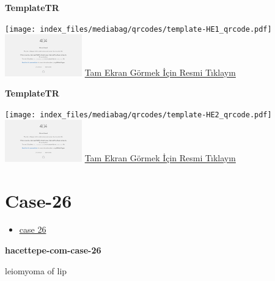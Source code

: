 \documentclass[
  letterpaper,
  DIV=11,
  numbers=noendperiod]{scrreprt}
\providecommand{\tightlist}{%
  \setlength{\itemsep}{0pt}\setlength{\parskip}{0pt}}\usepackage{longtable,booktabs,array}
\begin{document}
\textbf{TemplateTR}

\texttt{[image: index\_files/mediabag/qrcodes/template-HE1\_qrcode.pdf]}
\href{https://images.patolojiatlasi.com/template/HE1.html}{\includegraphics[width=0.25\textwidth,height=\textheight]{./screenshots/thumbnail_template-HE1.png}}
\href{https://images.patolojiatlasi.com/template/HE1.html}{Tam Ekran
Görmek İçin Resmi Tıklayın}

\textbf{TemplateTR}

\texttt{[image: index\_files/mediabag/qrcodes/template-HE2\_qrcode.pdf]}
\href{https://images.patolojiatlasi.com/template/HE2.html}{\includegraphics[width=0.25\textwidth,height=\textheight]{./screenshots/thumbnail_template-HE2.png}}
\href{https://images.patolojiatlasi.com/template/HE2.html}{Tam Ekran
Görmek İçin Resmi Tıklayın}

\hypertarget{sec-hacettepe-case-of-the-month-case-26}{%
\section{Case-26}\label{sec-hacettepe-case-of-the-month-case-26}}

\begin{itemize}
\tightlist
\item
  \href{https://www.youtube.com/watch?v=UHadS40tpkY&ab_channel=KemalKosemehmetoglu}{case
  26}
\end{itemize}

\textbf{hacettepe-com-case-26}

\begin{tcolorbox}[enhanced jigsaw, breakable, opacitybacktitle=0.6, arc=.35mm, colbacktitle=quarto-callout-tip-color!10!white, colback=white, toptitle=1mm, left=2mm, opacityback=0, colframe=quarto-callout-tip-color-frame, titlerule=0mm, rightrule=.15mm, bottomrule=.15mm, toprule=.15mm, bottomtitle=1mm, title=\textcolor{quarto-callout-tip-color}{\faLightbulb}\hspace{0.5em}{Tanı}, coltitle=black, leftrule=.75mm]

leiomyoma of lip

\end{tcolorbox}
\end{document}
